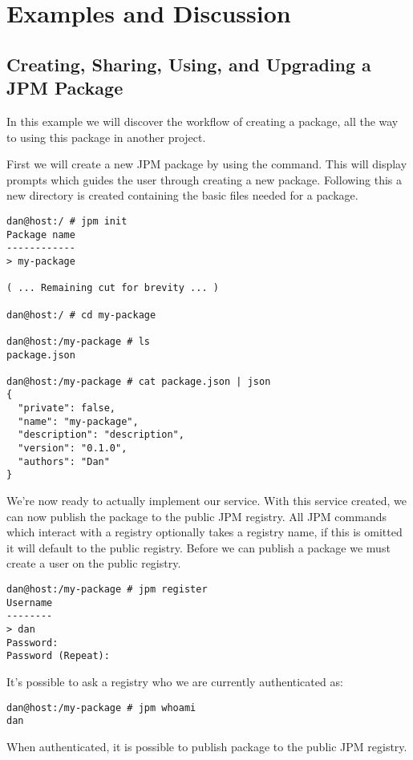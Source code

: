 \section{Examples and Discussion}

\subsection{Creating, Sharing, Using, and Upgrading a JPM Package}
\label{sec:jpm_basic_example}

In this example we will discover the workflow of creating a package, all the
way to using this package in another project.

First we will create a new JPM package by using the  command.
This will display prompts which guides the user through creating a new package.
Following this a new directory is created containing the basic files needed for
a package.

\begin{verbatim}
dan@host:/ # jpm init
Package name
------------
> my-package

( ... Remaining cut for brevity ... )

dan@host:/ # cd my-package

dan@host:/my-package # ls
package.json

dan@host:/my-package # cat package.json | json
{
  "private": false,
  "name": "my-package",
  "description": "description",
  "version": "0.1.0",
  "authors": "Dan"
}
\end{verbatim}

We're now ready to actually implement our service. With this service created,
    we can now publish the package to the public JPM registry. All JPM commands
    which interact with a registry optionally takes a registry name, if this is
    omitted it will default to the public registry.  Before we can publish a
    package we must create a user on the public registry.

\begin{verbatim}
dan@host:/my-package # jpm register
Username
--------
> dan
Password:
Password (Repeat):
\end{verbatim}

It's possible to ask a registry who we are currently authenticated as:

\begin{verbatim}
dan@host:/my-package # jpm whoami
dan
\end{verbatim}

When authenticated, it is possible to publish package to the public JPM
registry.

